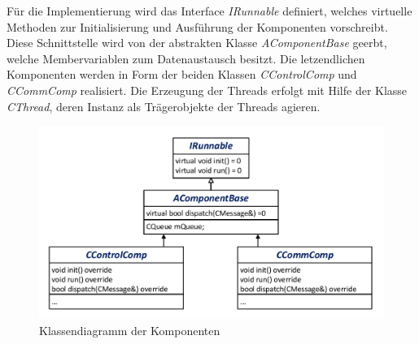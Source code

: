 Für die Implementierung wird das Interface \textit{IRunnable} definiert, welches virtuelle Methoden zur Initialisierung und Ausführung der Komponenten vorschreibt. Diese Schnittstelle wird von der abstrakten Klasse \textit{AComponentBase} geerbt, welche Membervariablen zum Datenaustausch besitzt. Die letzendlichen Komponenten werden in Form der beiden Klassen \textit{CControlComp} und \textit{CCommComp} realisiert. Die Erzeugung der Threads erfolgt mit Hilfe der Klasse \textit{CThread}, deren Instanz als Trägerobjekte der Threads agieren.
\begin{figure}[!h]
\centering
\includegraphics[width=0.6\linewidth]{img/SW_1_KA_KD.pdf}
\caption{Klassendiagramm der Komponenten}
\end{figure}

